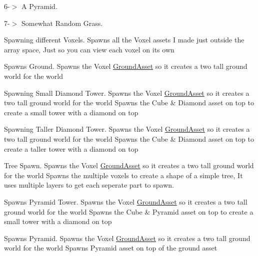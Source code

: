 6-\/$>$ A Pyramid.

7-\/$>$ Somewhat Random Grass.

Spawning different Voxels. Spawns all the Voxel assets I made just outside the array space, Just so you can view each voxel on it\textquotesingle{}s own

Spawns Ground. Spawns the Voxel \hyperlink{classGroundAsset}{Ground\+Asset} so it creates a two tall ground world for the world

Spawning Small Diamond Tower. Spawns the Voxel \hyperlink{classGroundAsset}{Ground\+Asset} so it creates a two tall ground world for the world Spawns the Cube \& Diamond asset on top to create a small tower with a diamond on top

Spawning Taller Diamond Tower. Spawns the Voxel \hyperlink{classGroundAsset}{Ground\+Asset} so it creates a two tall ground world for the world Spawns the Cube \& Diamond asset on top to create a taller tower with a diamond on top

Tree Spawn. Spawns the Voxel \hyperlink{classGroundAsset}{Ground\+Asset} so it creates a two tall ground world for the world Spawns the multiple voxels to create a shape of a simple tree, It uses multiple layers to get each seperate part to spawn.

Spawns Pyramid Tower. Spawns the Voxel \hyperlink{classGroundAsset}{Ground\+Asset} so it creates a two tall ground world for the world Spawns the Cube \& Pyramid asset on top to create a small tower with a diamond on top

Spawns Pyramid. Spawns the Voxel \hyperlink{classGroundAsset}{Ground\+Asset} so it creates a two tall ground world for the world Spawns Pyramid asset on top of the ground asset

